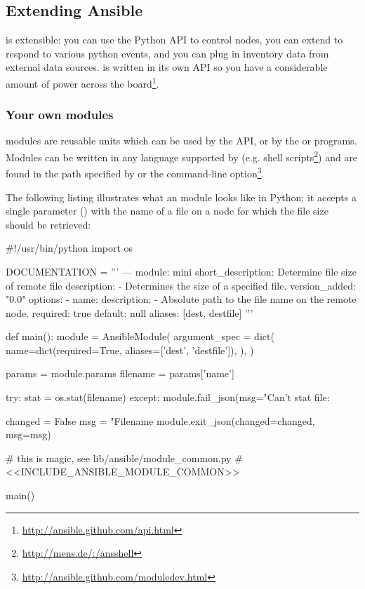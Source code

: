 \subsection*{Extending Ansible}

\ansible{} is extensible: you can use the \ansible{} Python API to control
nodes, you can extend \ansible{} to respond to various python events, and you can
plug in inventory data from external data sources. \ansible{} is written in its
own API so you have a considerable amount of power across the
board\footnote{\url{http://ansible.github.com/api.html}}.

\subsubsection*{Your own modules}

\ansible{} modules are reusable units which can be used by the \ansible{} API,
or by the  or  programs. Modules can be written
in any language supported by  (e.g. shell
scripts\footnote{\url{http://mens.de/:/ansshell}}) and are found in the path
specified by  or the  command-line
option\footnote{\url{http://ansible.github.com/moduledev.html}}.

The following listing illustrates what an \ansible{} module looks like in Python;
it accepts a single parameter () with the name of a file on a node for
which the file size should be retrieved:

\begin{extymeta}
#!/usr/bin/python
import os

DOCUMENTATION = '''
---
module: mini
short_description: Determine file size of remote file
description:
     - Determines the size of a specified file.
version_added: "0.0"
options:
  - name:
      description:
        - Absolute path to the file name on the remote node.
      required: true
      default: null
      aliases: [dest, destfile]
'''

def main():
    module = AnsibleModule(
        argument_spec = dict(
            name=dict(required=True, aliases=['dest', 'destfile']),
        ),
    )

    params = module.params
    filename = params['name']

    try:
        stat = os.stat(filename)
    except:
        module.fail_json(msg="Can't stat file: %

    changed = False
    msg = "Filename %
    module.exit_json(changed=changed, msg=msg)

# this is magic, see lib/ansible/module_common.py
#<<INCLUDE_ANSIBLE_MODULE_COMMON>>

main()
\end{extymeta}

